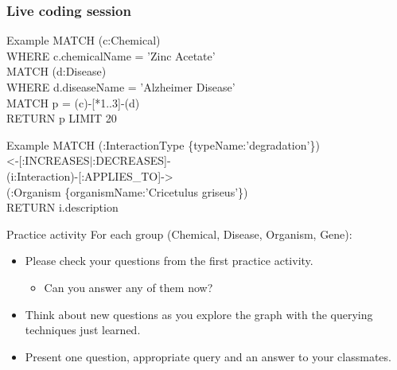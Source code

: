 \documentclass[12pt]{beamer}
\begin{document}
    \begin{frame}
        \frametitle{Live coding session}
        \begin{block}{Example}
            MATCH (c:Chemical)\\
            \hspace{1cm} WHERE c.chemicalName = 'Zinc Acetate'\\
            MATCH (d:Disease)\\
            \hspace{1cm} WHERE d.diseaseName = 'Alzheimer Disease'\\
            MATCH p = (c)-[*1..3]-(d)\\
            RETURN p LIMIT 20
        \end{block}
        \begin{block}{Example}
            MATCH (:InteractionType \{typeName:'degradation'\})\\
            \hspace{1cm} \textless-[:INCREASES\(|\):DECREASES]-\\
            \hspace{1cm} (i:Interaction)-[:APPLIES\_TO]-\textgreater\\
            \hspace{1cm} (:Organism \{organismName:'Cricetulus griseus'\})\\
            RETURN i.description
        \end{block}
    \end{frame}

    \begin{frame}{Practice activity}
        For each group (Chemical, Disease, Organism, Gene):
        \begin{itemize}
            \item Please check your questions from the first practice activity.
            \begin{itemize}
                \item Can you answer any of them now?
            \end{itemize}
            \item Think about new questions as you explore the graph with the querying techniques just learned.
            \item Present one question, appropriate query and an answer to your classmates.
        \end{itemize}
    \end{frame}
    
\end{document}
